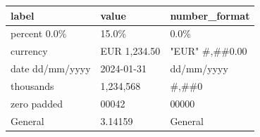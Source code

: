 \documentclass[11pt,a4paper]{article}
\begin{document}
\begin{table}[h]
\begin{tabular}{|l|l|l|}
\hline
label & value & number\_format \\ \hline
percent 0.0\% & 15.0\% & 0.0\% \\ \hline
currency & EUR 1,234.50 & "EUR" \#,\#\#0.00 \\ \hline
date dd/mm/yyyy & 2024-01-31 & dd/mm/yyyy \\ \hline
thousands & 1,234,568 & \#,\#\#0 \\ \hline
zero padded & 00042 & 00000 \\ \hline
General & 3.14159 & General \\ \hline
\end{tabular}
\end{table}
\end{document}

